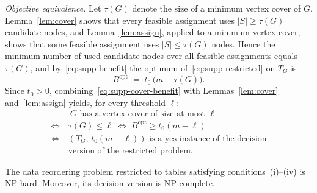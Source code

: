 \emph{Objective equivalence.}
Let $\tau(G)$ denote the size of a minimum vertex cover of $G$. Lemma~\ref{lem:cover} shows that every feasible assignment uses $|S|\geq\tau(G)$ candidate nodes, and Lemma~\ref{lem:assign}, applied to a minimum vertex cover, shows that some feasible assignment uses $|S|\leq\tau(G)$ nodes. Hence the minimum number of used candidate nodes over all feasible assignments equals $\tau(G)$, and by~\eqref{eq:supp-benefit} the optimum of~\eqref{eq:supp-restricted} on $T_G$ is
\begin{equation}
B^{\mathrm{opt}} \;=\; t_0\,\bigl(m-\tau(G)\bigr).
\label{eq:supp-cover-benefit}
\end{equation}
Since $t_0>0$, combining~\eqref{eq:supp-cover-benefit} with Lemmas~\ref{lem:cover} and~\ref{lem:assign} yields, for every threshold $\ell$:
\begin{equation}
\begin{aligned}
&\ G \text{ has a vertex cover of size at most } \ell\\
\iff\ & \tau(G)\leq \ell
\;\iff\; B^{\mathrm{opt}}\geq t_0(m-\ell)\\
\iff\ & (T_G,\,t_0(m-\ell)) \text{ is a yes-instance of the decision}\\
& \text{version of the restricted problem.}
\end{aligned}
\label{eq:supp-equivalence}
\end{equation}

\begin{theorem}
\label{thm:restricted-np-hard}
The data reordering problem restricted to tables satisfying conditions~(i)--(iv) is NP-hard. Moreover, its decision version is NP-complete.
\end{theorem}

